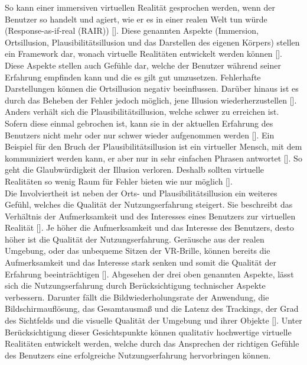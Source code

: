 \documentclass[a4paper,12pt,oneside]{article}
\begin{document}
        So kann einer immersiven
        virtuellen Realität gesprochen werden, wenn der Benutzer so handelt und agiert, wie er es
        in einer realen Welt tun würde (\glqq Response-as-if-real\grqq{} (RAIR)) 
        [\cite{Slater2009}]. Diese genannten Aspekte (Immersion, Ortsillusion, 
        Plausibilitätsillusion und das Darstellen des eigenen Körpers) stellen ein 
        Framework dar, wonach virtuelle Realitäten entwickelt werden können 
        [\cite{Slater2009}]. Diese Aspekte stellen auch Gefühle dar, welche der Benutzer
        während seiner Erfahrung empfinden kann und die es gilt gut umzusetzen.
        Fehlerhafte Darstellungen können die Ortsillusion negativ beeinflussen.
        Darüber hinaus ist es durch das Beheben der Fehler jedoch möglich, jene Illusion
        wiederherzustellen [\cite{Slater2009}].
        Anders verhält sich die Plausibilitätsillusion, welche schwer
        zu erreichen ist. Sofern diese einmal gebrochen ist, kann sie in der aktuellen 
        Erfahrung des Benutzers nicht mehr oder nur schwer wieder aufgenommen werden 
        [\cite{Slater2009}].
        Ein Beispiel für den Bruch der Plausibilitätsillusion ist ein virtueller Mensch,
        mit dem kommuniziert werden kann, er aber nur in sehr einfachen Phrasen antwortet
        [\cite[19]{Dorner2013}]. So geht die Glaubwürdigkeit der Illusion verloren. 
        Deshalb 
        sollten virtuelle Realitäten so wenig Raum für Fehler bieten wie nur 
        möglich [\cite{Slater2009}]. \\
        Die Involviertheit ist neben der Orts- und Plausibilitätsillusion ein weiteres
        Gefühl, welches die Qualität der Nutzungserfahrung steigert. Sie
        beschreibt das Verhältnis der Aufmerksamkeit und des Interesses eines Benutzers zur
        virtuellen Realität [\cite[227]{Witmer1998}]. Je höher die Aufmerksamkeit und das
        Interesse des Benutzers, desto höher ist die Qualität der Nutzungserfahrung.
        Geräusche aus der realen Umgebung, oder das unbequeme Sitzen der VR-Brille, können
        bereits die Aufmerksamkeit und das Interesse stark senken und somit die Qualität
        der Erfahrung beeinträchtigen [\cite[227]{Witmer1998}].
        Abgesehen der drei oben genannten Aspekte, lässt sich die Nutzungserfahrung durch
        Berücksichtigung technischer Aspekte verbessern. Darunter fällt die
        Bildwiederholungsrate der Anwendung, die Bildschirmauflösung, das Gesamtausmaß und
        die Latenz des Trackings, der Grad des Sichtfelds und die visuelle Qualität der Umgebung
        und ihrer Objekte [\cite{Slater2009}].
        Unter Berücksichtigung dieser Gesichtspunkte können qualitativ hochwertige
        virtuelle Realitäten entwickelt werden, welche durch das Ansprechen 
        der richtigen Gefühle des Benutzers eine erfolgreiche 
        Nutzungserfahrung hervorbringen können.
\end{document}
